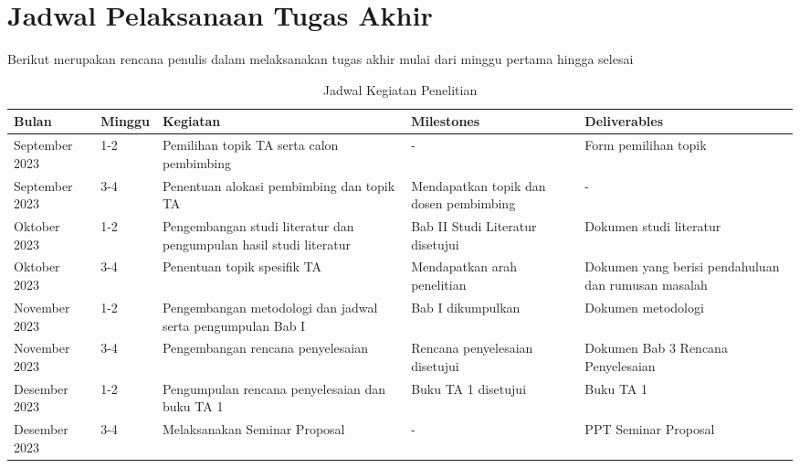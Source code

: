 \section{Jadwal Pelaksanaan Tugas Akhir}

Berikut merupakan rencana penulis dalam melaksanakan tugas akhir mulai dari minggu pertama hingga selesai

\begin{table}[ht]
  \centering
  \begin{tabular}{@{}llp{3cm}p{2.5cm}p{2.5cm}@{}}
    \hline
    Bulan          & Minggu & Kegiatan                                                           & Milestones                             & Deliverables                                        \\ \hline
    September 2023 & 1-2    & Pemilihan topik TA serta calon pembimbing                          & -                                      & Form pemilihan topik                                \\ \hline
    September 2023 & 3-4    & Penentuan alokasi pembimbing dan topik TA                          & Mendapatkan topik dan dosen pembimbing & -                                                   \\ \hline
    Oktober 2023   & 1-2    & Pengembangan studi literatur dan pengumpulan hasil studi literatur & Bab II Studi Literatur disetujui       & Dokumen studi literatur                             \\ \hline
    Oktober 2023   & 3-4    & Penentuan topik spesifik TA                                        & Mendapatkan arah penelitian            & Dokumen yang berisi pendahuluan dan rumusan masalah \\ \hline
    November 2023  & 1-2    & Pengembangan metodologi dan jadwal serta pengumpulan Bab I         & Bab I dikumpulkan                      & Dokumen metodologi                                  \\ \hline
    November 2023  & 3-4    & Pengembangan rencana penyelesaian                                  & Rencana penyelesaian disetujui         & Dokumen Bab 3 Rencana Penyelesaian                  \\ \hline
    Desember 2023  & 1-2    & Pengumpulan rencana penyelesaian dan buku TA 1                     & Buku TA 1 disetujui                    & Buku TA 1                                           \\ \hline
    Desember 2023  & 3-4    & Melaksanakan Seminar Proposal                                      & -                                      & PPT Seminar Proposal                                \\ \hline
  \end{tabular}
  \caption{Jadwal Kegiatan Penelitian}
  \label{tab:jadwal-kegiatan-penelitian}
\end{table}